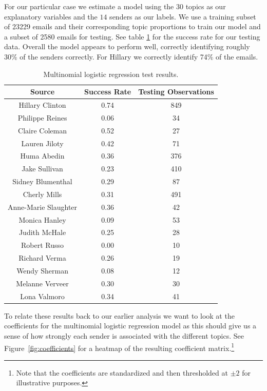 \documentclass[12pt]{article}
\theoremstyle{definition}
\theoremstyle{algodesc}
\begin{document}
For our particular case we estimate a model using the $30$ topics as our explanatory variables and the $14$ senders as our labels. We use a training subset of 23229 emails and their corresponding topic proportions to train our model and a subset of 2580 emails for testing. See table \ref{tab:mlr_success} for the success rate for our testing data. Overall the model appears to perform well, correctly identifying roughly 30\% of the senders correctly. For Hillary we correctly identify 74\% of the emails.

\begin{table}[htb] \centering
\begin{tabular}{ccc}
  \toprule
  Source               & Success Rate & Testing Observations \\
  \midrule
  Hillary Clinton      & 0.74         & 849 \\
  Philippe Reines      & 0.06         & 34 \\
  Claire Coleman       & 0.52         & 27 \\
  Lauren Jiloty        & 0.42         & 71 \\
  Huma Abedin          & 0.36         & 376 \\
  Jake Sullivan        & 0.23         & 410 \\
  Sidney Blumenthal    & 0.29         & 87 \\
  Cherly Mills         & 0.31         & 491 \\
  Anne-Marie Slaughter & 0.36         & 42 \\
  Monica Hanley        & 0.09         & 53 \\
  Judith McHale        & 0.25         & 28 \\
  Robert Russo         & 0.00         & 10 \\
  Richard Verma        & 0.26         & 19 \\
  Wendy Sherman        & 0.08         & 12 \\
  Melanne Verveer      & 0.30         & 30 \\
  Lona Valmoro         & 0.34         & 41 \\
  \bottomrule
\end{tabular}
\caption{Multinomial logistic regression test results.}
\label{tab:mlr_success}
\end{table}

To relate these results back to our earlier analysis we want to look at the coefficients for the multinomial logistic regression model as this should give us a sense of how strongly each sender is associated with the different topics. See Figure~\ref{fig:coefficients} for a heatmap of the resulting coefficient matrix.\footnote{Note that the coefficients are standardized and then thresholded at $\pm2$ for illustrative purposes.}
\end{document}
